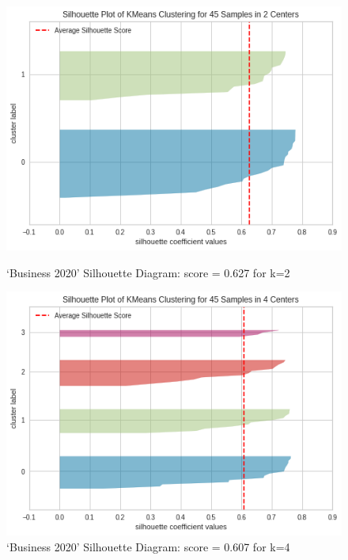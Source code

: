 \begin{figure}[H]
\begin{minipage}{0.45\linewidth}
\centering
\includegraphics[width=\linewidth]{images/cluster 2.png}
\caption{`Business 2020' Silhouette Diagram: score = 0.627 for k=2}
\label{fig:cluster2}
\end{minipage}
\hfill
\begin{minipage}{0.45\linewidth}
\centering
\includegraphics[width=\linewidth]{images/cluster 4.png}
\caption{`Business 2020' Silhouette Diagram: score = 0.607 for k=4}
\label{fig:cluster4}
\end{minipage}
\end{figure}

